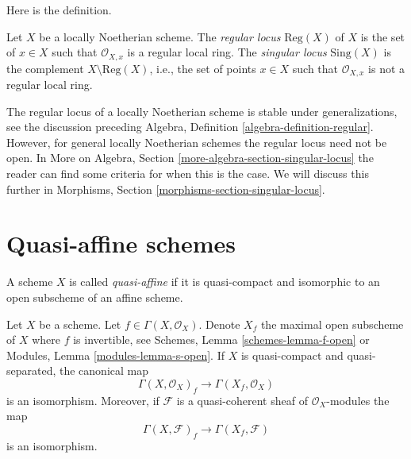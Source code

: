 \noindent
Here is the definition.

\begin{definition}
\label{definition-singular-locus}
Let $X$ be a locally Noetherian scheme. The {\it regular locus}
$\text{Reg}(X)$ of $X$ is the set of $x \in X$ such that $\mathcal{O}_{X, x}$
is a regular local ring. The {\it singular locus} $\text{Sing}(X)$ is the
complement $X \setminus \text{Reg}(X)$, i.e., the set of points $x \in X$
such that $\mathcal{O}_{X, x}$ is not a regular local ring.
\end{definition}

\noindent
The regular locus of a locally Noetherian scheme is stable under
generalizations, see the discussion preceding
Algebra, Definition \ref{algebra-definition-regular}.
However, for general locally Noetherian schemes the regular locus
need not be open. In
More on Algebra, Section \ref{more-algebra-section-singular-locus}
the reader can find some criteria for when this is the case.
We will discuss this further in
Morphisms, Section \ref{morphisms-section-singular-locus}.








\section{Quasi-affine schemes}
\label{section-quasi-affine}

\begin{definition}
\label{definition-quasi-affine}
A scheme $X$ is called {\it quasi-affine} if it is quasi-compact
and isomorphic to an open subscheme of an affine scheme.
\end{definition}

\begin{lemma}
\label{lemma-invert-f-sections}
Let $X$ be a scheme. Let $f \in \Gamma(X, \mathcal{O}_X)$.
Denote $X_f$ the maximal open subscheme of $X$ where $f$ is invertible, see
Schemes, Lemma \ref{schemes-lemma-f-open} or
Modules, Lemma \ref{modules-lemma-s-open}.
If $X$ is quasi-compact and quasi-separated, the canonical map
$$
\Gamma(X, \mathcal{O}_X)_f \longrightarrow \Gamma(X_f, \mathcal{O}_X)
$$
is an isomorphism. Moreover, if $\mathcal{F}$ is a quasi-coherent
sheaf of $\mathcal{O}_X$-modules the map
$$
\Gamma(X, \mathcal{F})_f \longrightarrow \Gamma(X_f, \mathcal{F})
$$
is an isomorphism.
\end{lemma}

